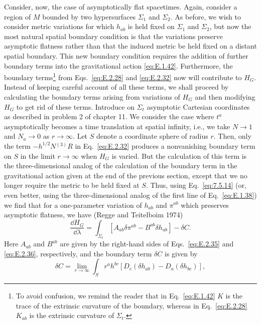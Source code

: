 Consider, now, the case of asymptotically flat spacetimes. Again, consider a region
of \(M\) bounded by two hypersurfaces \(\Sigma_1\) and \(\Sigma_2\). As before, we
wish to consider metric variations for which \(h_{ab}\) is held fixed on
\(\Sigma_1\) and \(\Sigma_2\), but now the most natural spatial boundary condition
is that the variations preserve asymptotic flatness rather than that the induced
metric be held fixed on a distant spatial boundary. This new boundary condition
requires the addition of further boundary terms into the gravitational action
\eqref{eq:E.1.42}. Furthermore, the boundary terms\footnote{To avoid confusion, we
remind the reader that in Eq.~\eqref{eq:E.1.42} \(K\) is the trace of the
extrinsic curvature of the boundary, whereas in Eq.~\eqref{eq:E.2.28} \(K_{ab}\)
is the extrinsic curvature of \(\Sigma_t\).} from Eqs.~\eqref{eq:E.2.28} and
\eqref{eq:E.2.32} now will contribute to \(H_G\). Instead of keeping careful
account of all these terms, we shall proceed by calculating the boundary terms
arising from variations of \(H_G\) and then modifying \(H_G\) to get rid of these
terms. Introduce on \(\Sigma_t\) asymptotic Cartesian coordinates as described in
problem 2 of chapter 11. We consider the case where \(t^a\) asymptotically becomes
a time translation at spatial infinity, i.e., we take \(N\to1\) and \(N_a\to0\) as
\(r\to\infty\). Let \(S\) denote a coordinate sphere of radius \(r\). Then, only
the term \(-h^{1/2}N{}^{(3)}R\) in Eq.~\eqref{eq:E.2.32} produces a nonvanishing
boundary term on \(S\) in the limit \(r\to\infty\) when \(H_G\) is varied. But the
calculation of this term is the three-dimensional analog of the calculation of the
boundary term in the gravitational action given at the end of the previous section,
except that we no longer require the metric to be held fixed at \(S\). Thus, using
Eq.~\eqref{eq:7.5.14} (or, even better, using the three-dimensional analog of the
first line of Eq.~\eqref{eq:E.1.38}) we find that for a one-parameter variation of
\(h_{ab}\) and \(\pi^{ab}\) which preserves asymptotic flatness, we have (Regge and
Teitelboim 1974)
\begin{equation}
  \frac{\dd H_G}{\dd\lambda}
    =\int_{\Sigma_t}\left[A_{ab}\delta\pi^{ab}-B^{ab}\delta h_{ab}\right]
      -\delta C.
  \tag{E.2.44}\label{eq:E.2.44}
\end{equation}
Here \(A_{ab}\) and \(B^{ab}\) are given by the right-hand sides of
Eqs.~\eqref{eq:E.2.35} and \eqref{eq:E.2.36}, respectively, and the boundary term
\(\delta C\) is given by
\begin{equation}
  \delta C=\lim_{r\to\infty}\int_S
    r^ah^{bc}\left[D_c(\delta h_{ab})-D_a(\delta h_{bc})\right],
  \tag{E.2.45}\label{eq:E.2.45}
\end{equation}
